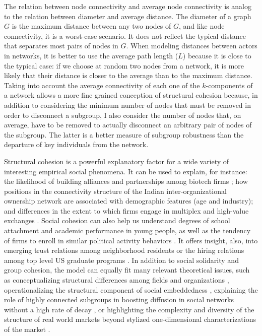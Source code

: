 The relation between node connectivity and average node connectivity is analog to the relation between diameter and average distance. The diameter of a graph $G$ is the maximum distance between any two nodes of $G$, and like node connectivity, it is a worst-case scenario. It does not reflect the typical distance that separates most pairs of nodes in $G$. When modeling distances between actors in networks, it is better to use the average path length ($L$) because it is close to the typical case: if we choose at random two nodes from a network, it is more likely that their distance is closer to the average than to the maximum distance. Taking into account the average connectivity of each one of the $k$-components of a network allows a more fine grained conception of structural cohesion because, in addition to considering the minimum number of nodes that must be removed in order to disconnect a subgroup, I also consider the number of nodes that, on average, have to be removed to actually disconnect an arbitrary pair of nodes of the subgroup. The latter is a better measure of subgroup robustness than the departure of key individuals from the network.

Structural cohesion is a powerful explanatory factor for a wide variety of interesting empirical social phenomena. It can be used to explain, for instance: the likelihood of building alliances and partnerships among biotech firms \citep{powell:2005}; how positions in the connectivity structure of the Indian inter-organizational ownership network are associated with demographic features (age and industry); and differences in the extent to which firms engage in multiplex and high-value exchanges \citep{mani:2014}. Social cohesion can also help us understand degrees of school attachment and academic performance in young people, as well as the tendency of firms to enroll in similar political activity behaviors \citep{moody:2003}.  It offers insight, also, into emerging trust relations among neighborhood residents or the hiring relations among top level US graduate programs \citep{grannis:2009}. In addition to social solidarity and group cohesion, the model can equally fit many relevant theoretical issues, such as conceptualizing structural differences among fields and organizations \citep{white:2004}, operationalizing the structural component of social embeddedness \citep{granovetter:1985,moody:2004}, explaining the role of highly connected subgroups in boosting diffusion in social networks without a high rate of decay \citep{moody:2004, white:2001}, or highlighting the complexity and diversity of the structure of real world markets beyond stylized one-dimensional characterizations of the market \citep{mani:2014}.

